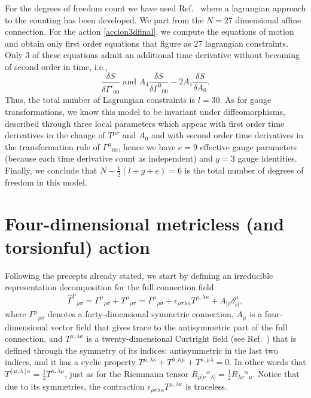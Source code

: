 \documentclass{ws-mpla}
\renewcommand{\(}{\left(}
\renewcommand{\)}{\right)}
\renewcommand{\[}{\left[}
\renewcommand{\]}{\right]}
\begin{document}
For the degrees of freedom count we have used Ref.~\cite{Diaz:2014yua} where a lagrangian approach to the counting has been developed. We part from the $ N=27$ dimensional affine connection.  For the action \eqref{accion3dfinal}, we compute the equations of motion and obtain only first order equations that figure as 27 lagrangian constraints. Only 3 of these equations admit an additional time derivative without becoming of second order in time,  i.e., 
\begin{equation*}
  \frac{\delta S}{\delta\Gamma^i{}_{00}} \text{ and } A_4 \frac{\delta S}{\delta\Gamma^0{}_{00}} - 2 A_1 \frac{\delta S}{\delta A_{0}}.
\end{equation*}
Thus, the total number of Lagrangian constraints is \mbox{$l=30$.} As for gauge transformations, we know this model to be invariant under diffeomorphisms, described through three local parameters which appear with first order time derivatives in the change of $T^{\mu\nu}$ and $ A_0$ and with second order time derivatives in the transformation rule of $\Gamma^\mu{}_{00} $, hence we have $e=9$ effective gauge parameters (because each time derivative count as independent) and $g=3$ gauge identities. Finally,  we conclude that   \mbox{$N-\frac{1}{2}(l+g+e) = 6$} is the total number of degrees of freedom in this model. 


\section{\label{sec:4} Four-dimensional metricless (and torsionful) action}

Following the precepts  already stated, we start  by defining an irreducible representation decomposition for the full connection field 
\begin{equation}
  \hat{\Gamma}^\mu{}_{\rho\sigma} = {\Gamma}^\mu{}_{\rho\sigma} + T^\mu{}_{\rho\sigma} = {\Gamma}^\mu{}_{\rho\sigma} + \epsilon_{\rho\sigma\lambda\kappa}T^{\mu,\lambda\kappa}+A_{[\rho}\delta^\mu_{\nu]},
\end{equation}
where ${\Gamma}^\mu{}_{\rho\sigma}$ denotes a forty-dimensional symmetric connection, $A_\mu$ is a four-dimensional vector field  that gives trace to the antisymmetric part of the full connection, and  $T^{\mu,\lambda\kappa}$ is a twenty-dimensional Curtright field (see Ref.~\cite{Curtright:1980yk}) that is defined through the symmetry of its indices: antisymmetric in the last two indices, and it has a cyclic property $T^{\mu,\lambda\kappa}+T^{\lambda,\kappa\mu}+T^{\kappa,\mu\lambda}=0$. In other words that $T^{[\mu,\lambda]\kappa}=\frac{1}{2}T^{\kappa,\lambda\mu}$, just as for  the Riemmann tensor ${R}_{\mu[\nu}{}^\alpha{}_{\lambda]}=\frac{1}{2}{R}_{\lambda\nu}{}^\alpha{}_{\mu}$. Notice that due to its symmetries, the contraction $\epsilon_{\rho\sigma\lambda\kappa}T^{\mu,\lambda\kappa}$ is traceless.
\end{document}
